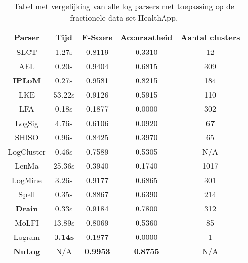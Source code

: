 \begin{table}[!htp]
    \caption{Tabel met vergelijking van alle log parsers met toepassing op de fractionele data set HealthApp.}
    \label{table:HealthApp}
    \begin{center}
        \begin{tabular}{||c | c | c | c | c||} 
            \hline
            Parser & Tijd & F-Score & Accuraatheid & Aantal clusters \\ [0.5ex] 
            \hline\hline
            SLCT & 1.27s & 0.8119 & 0.3310 & 12 \\
            
            AEL & 0.20s & 0.9404 & 0.6815 & 309 \\ 
            
            \textbf{IPLoM} & 0.27s & 0.9581 & 0.8215 & 184 \\
            
            LKE & 53.22s & 0.9126 & 0.5915 & 110 \\
            
            LFA & 0.18s & 0.1877 & 0.0000 & 302 \\
            
            LogSig & 4.76s & 0.6106 & 0.0920 & \textbf{67} \\
            
            SHISO & 0.96s & 0.8425 & 0.3970 & 65 \\
            
            LogCluster & 0.46s & 0.7589 & 0.5305 & N/A \\
            
            LenMa & 25.36s & 0.3940 & 0.1740 & 1017 \\
            
            LogMine & 3.26s & 0.9177 & 0.6865 & 301 \\
            
            Spell & 0.35s & 0.8867 & 0.6390 & 214 \\
            
            \textbf{Drain} & 0.33s & 0.9184 & 0.7800 & 312 \\
            
            MoLFI & 13.89s & 0.8069 & 0.5360 & 85 \\
            
            Logram & \textbf{0.14s} & 0.1877 & 0.0000 & 1 \\
            
            \textbf{NuLog} & N/A & \textbf{0.9953} & \textbf{0.8755} & N/A \\
            \hline
        \end{tabular}
    \end{center}
\end{table}

